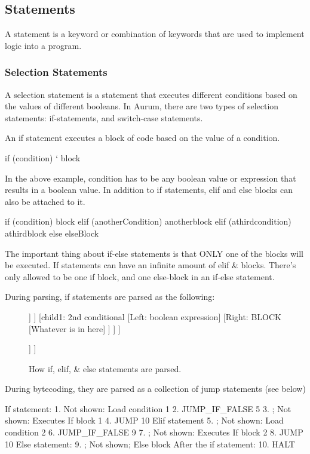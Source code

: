 \documentclass[12pt, letterpaper, oneside]{article}
\begin{document}
	\subsection{Statements}
	A statement is a keyword or combination of keywords that are used to implement logic into a program.
	\subsubsection{Selection Statements}
	A selection statement is a statement that executes different conditions based on the values of different booleans. In Aurum, there are two types of selection statements: if-statements, and switch-case statements.
	
	
	An if statement executes a block of code based on the value of a condition.
	\begin{spverbatim}
		if (condition) {
			` block
		}
	\end{spverbatim}
	In the above example, condition has to be any boolean value or expression that results in a boolean value. In addition to if statements, elif and else blocks can also be attached to it.
	\begin{spverbatim}
		if (condition) {
			block
		}
		elif (anotherCondition) {
			anotherblock
		}
		elif (athirdcondition) {
			athirdblock
		}
		else {
			elseBlock
		}
	\end{spverbatim}
	The important thing about if-else statements is that ONLY one of the blocks will be executed. If statements can have an infinite amount of elif \& blocks. There's only allowed to be one if block, and one else-block in an if-else statement.
	
	\newpage
	During parsing, if statements are parsed as the following: \newline 
	\begin{figure}[h]
		\begin{forest}
			[IF\_STATEMENT
			[child0: 1st conditional
			[Left: boolean expression]
			[Right: BLOCK
			[Whatever is in here]
			]
			]
			[child1: 2nd conditional
			[Left: boolean expression]
			[Right: BLOCK
			[Whatever is in here]
			]
			]
			]
		\end{forest} 
		\begin{forest}
			[ELSE
			[BLOCK
			[Whatever is in here]
			]
			]
		\end{forest}
		\caption{How if, elif, \& else statements are parsed.}
	\end{figure} \newline
	During bytecoding, they are parsed as a collection of jump statements (see below)
	\begin{spverbatim}
		If statement:
		1. Not shown: Load condition 1
		2. JUMP_IF_FALSE 5
		3. ; Not shown: Executes If block 1
		4. JUMP 10
		Elif statement
		5. ; Not shown: Load condition 2
		6. JUMP_IF_FALSE 9
		7. ; Not shown: Executes If block 2
		8. JUMP 10
		Else statement:
		9. ; Not shown; Else block
		After the if statement:
		10. HALT
	\end{spverbatim}
	\newpage
	
\end{document}
